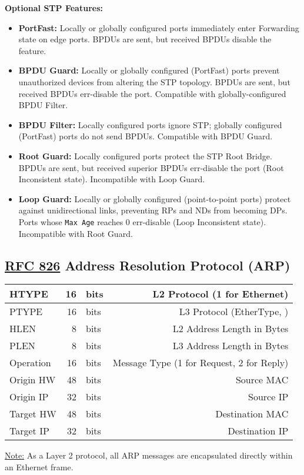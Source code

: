 \documentclass[12pt]{article}
\newif\ifcolor											%
\newcommand{\note}[1]{\ifcolor \colorbox{#1}{Note:}\else \underline{Note:}\fi}
\newcommand{\RFC}[1]{\href{https://datatracker.ietf.org/doc/html/rfc#1}{RFC #1}}
\begin{document}
	\textbf{Optional STP Features:}
	\begin{itemize}[leftmargin=*,label=]
		\label{itm:STP FEATURES}
		\item{\textbf{PortFast:} Locally or globally configured ports immediately enter Forwarding state on edge ports. BPDUs are sent, but received BPDUs disable the feature.}
		\item{\textbf{BPDU Guard:} Locally or globally configured (PortFast) ports prevent unauthorized devices from altering the STP topology. BPDUs are sent, but received BPDUs err-disable the port. Compatible with globally-configured BPDU Filter.}
		\item{\textbf{BPDU Filter:} Locally configured ports ignore STP; globally configured (PortFast) ports do not send BPDUs. Compatible with BPDU Guard.}
		\item{\textbf{Root Guard:} Locally configured ports protect the STP Root Bridge. BPDUs are sent, but received superior BPDUs err-disable the port (Root Inconsistent state). Incompatible with Loop Guard.}
		\item{\textbf{Loop Guard:} Locally or globally configured (point-to-point ports) protect against unidirectional links, preventing RPs and NDs from becoming DPs. Ports whose \texttt{Max Age} reaches 0 err-disable (Loop Inconsistent state). Incompatible with Root Guard.}
	\end{itemize}


	\subsection[RFC 826 ARP]{\RFC{826} Address Resolution Protocol (ARP) \label{subsec:ARP}}
	\begin{table}[H]
	\centering
	\begin{tabular}{| l | r @{ } l | r |}\hline
	HTYPE	& 16	& bits	& L2 Protocol (1 for Ethernet)\\\hline
	PTYPE	& 16	& bits	& L3 Protocol (EtherType, \Cref{tab:ETHERTYPE})\\\hline
	HLEN		& 8	& bits	& L2 Address Length in Bytes\\\hline
	PLEN		& 8	& bits	& L3 Address Length in Bytes\\\hline
	Operation	& 16	& bits	& Message Type (1 for Request, 2 for Reply)\\\hline
	Origin HW 	& 48	& bits	& Source MAC\\\hline
	Origin IP	& 32	& bits	& Source IP\\\hline
	Target HW 	& 48	& bits	& Destination MAC\\\hline
	Target IP	& 32	& bits	& Destination IP\\\hline
	\end{tabular}\end{table}
	\note{Goldenrod} As a Layer 2 protocol, all ARP messages are encapsulated directly within an Ethernet frame.
\end{document}
